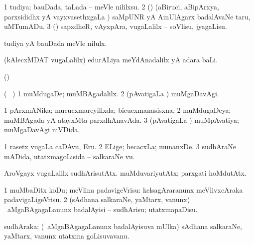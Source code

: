 {{\bentry
{} 
\gl{\sakirx}
\expl{}
\bmng
\bnum
\num{1} tudiya; bauDada, taLada -- meVle nililxsu. 
\num{2} (\AmA) (aBiruci, aBipArxya, parxsididhx yA vayxvasethxgaLa \vi) saMpUNR yA AmUlAgarx badalAvaNe taru, uMTumADu. 
\num{3} (\AmA) sapxdheR, vAyxpAra, \mo vugaLalilx -- soVlisu, jyagaLisu. 
\enum
\emng

\noindent
\gl{\akirx}
\expl{}
\bmng
tudiya yA bauDada meVle nilulx. 
\emng
\eentry

\bentry
{} 
\gl{\kirxvi}
\expl{}
\bmng
(kAlecxMDAT \mo vugaLalilx) edurALiya meYdAnadalilx yA adara baLi. 
\emng
\eentry

\bentry
{} 
\gl{\nA}
\expl{}
\bmng
(\BUvi)  
\emng
\eentry

\bentry
{} 
\gl{\kirxvi}
\expl{}
\bmng
(\sA\  ) 
\bnum
\num{1} muMdugaDe; muMBAgadalilx. 
\num{2} (pAvatigaLa \vi) muMgaDavAgi. 
\enum
\emng
\eentry

\bentry
{} 
\gl{\gu}
\expl{}
\bmng
\bnum
\num{1} pArxmANika; mucucxmareyillxda; bicucxmanasisxna. 
\num{2} muMdugaDeya; muMBAgada yA atayxMta parxdhAnavAda. 
\num{3} (pAvatigaLa \vi) muMpAvatiya; muMgaDavAgi niVDida. 
\enum
\emng
\eentry

\bentry
{} 
\gl{\nA}
\expl{}
\bmng
\bnum
\num{1} rasetx \mo vugaLa caDAvu, Eru. 
\num{2} ELige; hecacxLa; munanxDe. 
\num{3} sudhAraNe mADida, utatxmagoLisida -- salkaraNe \mo vu. 
\enum
\emng

\noindent
\gl{\pagu}
\expl{}
\bmng
{} 
\banum
{} AroVgayx \mo vugaLalilx sudhArisutAtx. 
 muMduvariyutAtx; parxgati hoMdutAtx. 
\eanum
\emng
\eentry

\bentry
{} 
\gl{\sakirx}
\expl{}
\bmng
\bnum
\num{1} muMbaDitx koDu; meVlina padavigeVrisu:  kelsagAraranunx meVlivxcAraka padavigaLigeVrisu. 
\num{2} (sAdhana salkaraNe, yaMtarx, \mo vanunx) \kanmu\ aMgaBAgagaLanunx badalAyisi -- sudhArisu; utatxmapaDisu. 
\enum
\emng
\eentry

\bentry
{} 
\gl{\nA}
\expl{}
\bmng
sudhAraka; (\kanmu\ aMgaBAgagaLanunx badalAyisuva mUlka) sAdhana salkaraNe, yaMtarx, \mo vanunx utatxma goLisuvavanu. 
\emng
\eentry

}}
